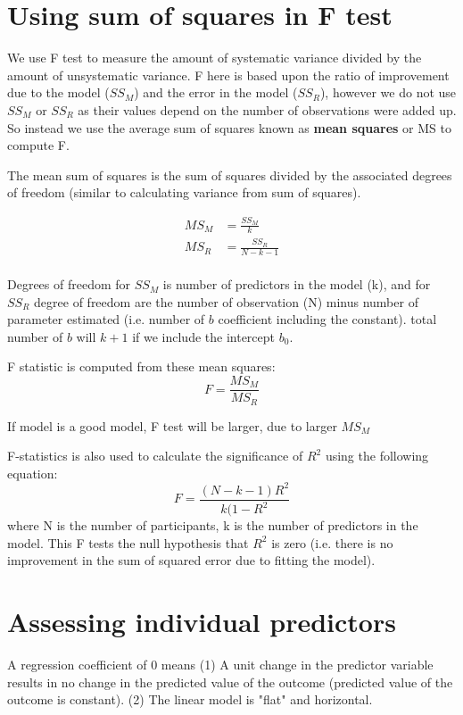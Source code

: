 \section{Using sum of squares in F test}
We use F test to measure the amount of systematic variance divided by the amount of unsystematic variance. 
F here is based upon the ratio of improvement due to the model ($SS_M$) and the error in the model ($SS_R$), however we do not use $SS_M$ or $SS_R$ as their values depend on the number of observations were added up. So instead we use the average sum of squares known as \textbf{mean squares} or MS to compute F.

The mean sum of squares is the sum of squares divided by the associated degrees of freedom (similar to calculating variance from sum of squares). 

\begin{equation}
\begin{split}
MS_M & = \frac{SS_M}{k}\\
MS_R & = \frac{SS_R}{N-k-1}\\
\end{split}
\end{equation}

Degrees of freedom for $SS_M$ is number of predictors in the model (k), and for $SS_R$ degree of freedom are the number of observation (N) minus number of parameter estimated (i.e. number of $b$ coefficient including the constant).  total number of $b$ will $k+1$ if we include the intercept $b_0$.

F statistic is computed from these mean squares: 
\begin{equation}
F = \frac{MS_M}{MS_R}
\end{equation}

If model is a good model, F test will be larger, due to larger $MS_M$

F-statistics is also used to calculate the significance of $R^2$ using the following equation:
\begin{equation}
F = \frac{(N-k-1)R^2}{k(1-R^2}
\end{equation}
where N is the number of participants, k is the number of predictors in the model. This F tests the null hypothesis that $R^2$ is zero (i.e. there is no improvement in the sum of squared error due to fitting the model).

\section{Assessing individual predictors}
A regression coefficient of 0 means (1) A unit change in the predictor variable results in no change in the predicted value of the outcome (predicted value of the outcome is constant). (2) The linear model is "flat" and horizontal. 

